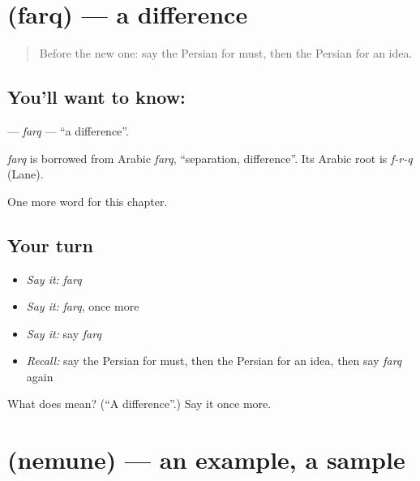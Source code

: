 \section[\texorpdfstring{\fa{فرق} (farq)}{فرق (farq)}]{ (farq) — a difference}

\label{lesson:FA-C198-farq}



\begin{quote}
Before the new one: say the Persian for must, then the Persian for an idea.
\end{quote}

\subsection*{You'll want to know: }
\textbf{} — \emph{farq} — \textquotedblleft{}a difference\textquotedblright{}.

\begin{cousinweb}
\emph{farq} is borrowed from Arabic \emph{farq}, \textquotedblleft{}separation, difference\textquotedblright{}. Its Arabic root is \emph{f-r-q} (Lane).
\end{cousinweb}

\begin{grammarlens}[title={What you've built}]
One more word for this chapter.
\end{grammarlens}

\subsection*{Your turn}
\begin{itemize}
\raggedright
  \item \emph{Say it:} \emph{farq}
  \item \emph{Say it:} \emph{farq}, once more
  \item \emph{Say it:} say \emph{farq}
  \item \emph{Recall:} say the Persian for must, then the Persian for an idea, then say \emph{farq} again
\end{itemize}

\begin{tcolorbox}[breakable,colback=teal!4,colframe=teal!35!black,title={Before you move on}]
What does  mean? (\textquotedblleft{}A difference\textquotedblright{}.) Say it once more.
\end{tcolorbox}
\section[\texorpdfstring{\fa{نمونه} (nemune)}{نمونه (nemune)}]{ (nemune) — an example, a sample}

